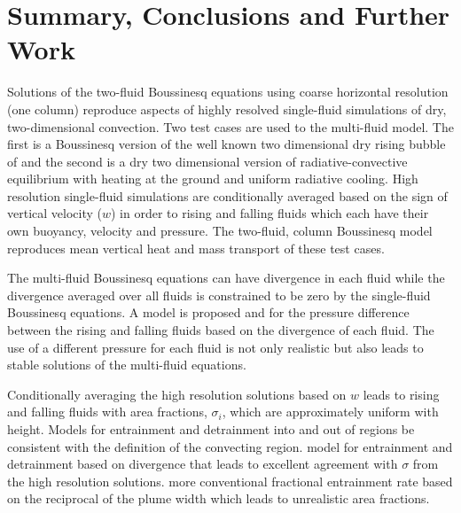 \documentclass[draft]{agujournal2019}
\begin{document}

\section{Summary, Conclusions and Further Work \label{sec:concs}}

{Solutions of the two-fluid Boussinesq equations using coarse horizontal resolution (one column) reproduce aspects of highly resolved single-fluid simulations of dry, two-dimensional convection.}
Two test cases are used to 
the multi-fluid model. The first is a Boussinesq version of the well
known two dimensional dry rising bubble of  and the second
is a dry two dimensional version of radiative-convective equilibrium
with heating at the ground and uniform radiative cooling. High resolution
single-fluid simulations are conditionally averaged based on the sign
of vertical velocity ($w$) in order to  rising and falling fluids which each have their own  buoyancy, velocity and pressure. The two-fluid,  column Boussinesq model reproduces mean vertical heat and mass transport of these test cases. 

The multi-fluid Boussinesq equations can have divergence in each fluid
while the divergence averaged over all fluids is 
{constrained to be zero by the single-fluid Boussinesq equations.}
A model is proposed and  for the pressure difference between the rising
and falling fluids based on the divergence of each fluid. The use
of a different pressure for each fluid is not only realistic but also
leads to stable solutions of the multi-fluid equations. 

Conditionally averaging the high resolution solutions based on $w$
leads to
{rising and falling fluids} with area fractions,
$\sigma_{i}$, which are approximately uniform with height. Models
for entrainment and detrainment into and out of  regions
 be consistent with the definition of the convecting region.
 model for entrainment and detrainment based on divergence 
that leads to excellent agreement with $\sigma$ from the high resolution
solutions.  more conventional fractional entrainment rate based on the reciprocal of the plume width  which leads to unrealistic  area fractions. 
\end{document}
